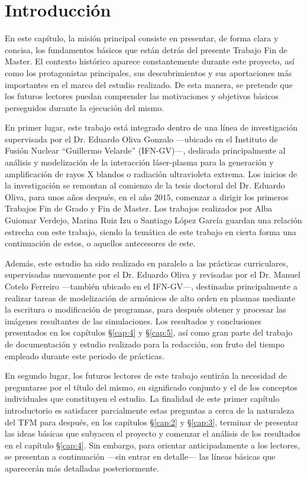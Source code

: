 \chapter{Introducción}\label{cap:1}
En este capítulo, la misión principal consiste en presentar, de forma clara y concisa, los fundamentos básicos que están detrás del presente Trabajo Fin de Master. El contexto histórico aparece constantemente durante este proyecto, así como los protagonistas principales, sus descubrimientos y sus aportaciones más importantes en el marco del estudio realizado. De esta manera, se pretende que los futuros lectores puedan comprender las motivaciones y objetivos básicos perseguidos durante la ejecución del mismo.

En primer lugar, este trabajo está integrado dentro de una línea de investigación supervisada por el Dr. Eduardo Oliva Gonzalo ---ubicado en el Instituto de Fusión Nuclear \enquote{Guillermo Velarde} (IFN-GV)---, dedicada principalmente al análisis y modelización de la interacción láser-plasma para la generación y amplificación de rayos X blandos o radiación ultravioleta extrema. Los inicios de la investigación se remontan al comienzo de la tesis doctoral del Dr. Eduardo Oliva\autocite{Oliva2010MejoraX}, para unos años después, en el año $2015$, comenzar a dirigir los primeros Trabajos Fin de Grado y Fin de Master. Los trabajos realizados por Alba Guiomar Verdejo, Marina Ruiz Izu o Santiago López García guardan una relación estrecha con este trabajo, siendo la temática de este trabajo en cierta forma una continuación de estos, o aquellos antecesores de este.

Además, este estudio ha sido realizado en paralelo a las prácticas curriculares, supervisadas nuevamente por el Dr. Eduardo Oliva y revisadas por el Dr. Manuel Cotelo Ferreiro ---también ubicado en el IFN-GV---, destinadas principalmente a realizar tareas de modelización de armónicos de alto orden en plasmas mediante la escritura o modificación de programas, para después obtener y procesar las imágenes resultantes de las simulaciones. Los resultados y conclusiones presentados en los capítulos \S\ref{cap:4} y \S\ref{cap:5}, así como gran parte del trabajo de documentación y estudio realizado para la redacción, son fruto del tiempo empleado durante este periodo de prácticas.

En segundo lugar, los futuros lectores de este trabajo sentirán la necesidad de preguntarse por el título del mismo, su significado conjunto y el de los conceptos individuales que constituyen el estudio. La finalidad de este primer capítulo introductorio es satisfacer parcialmente estas preguntas a cerca de la naturaleza del TFM para después, en los capítulos \S\ref{cap:2} y \S\ref{cap:3}, terminar de presentar las ideas básicas que subyacen el proyecto y comenzar el análisis de los resultados en el capítulo \S\ref{cap:4}. Sin embargo, para orientar anticipadamente a los lectores, se presentan a continuación ---sin entrar en detalle--- las líneas básicas que aparecerán más detalladas posteriormente.

